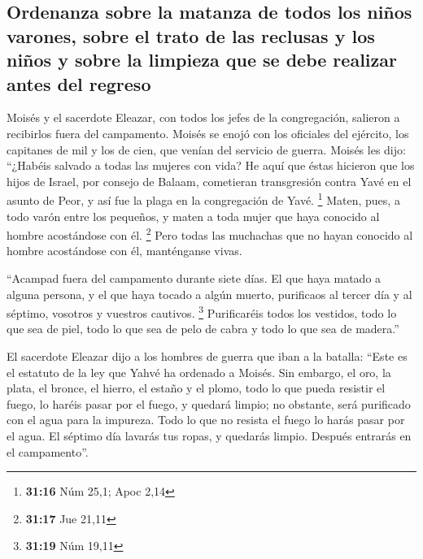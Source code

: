 \hypertarget{ordenanza-sobre-la-matanza-de-todos-los-niuxf1os-varones-sobre-el-trato-de-las-reclusas-y-los-niuxf1os-y-sobre-la-limpieza-que-se-debe-realizar-antes-del-regreso}{%
\subsection{Ordenanza sobre la matanza de todos los niños varones, sobre
el trato de las reclusas y los niños y sobre la limpieza que se debe
realizar antes del
regreso}\label{ordenanza-sobre-la-matanza-de-todos-los-niuxf1os-varones-sobre-el-trato-de-las-reclusas-y-los-niuxf1os-y-sobre-la-limpieza-que-se-debe-realizar-antes-del-regreso}}

 Moisés y el sacerdote Eleazar, con todos los jefes de la
congregación, salieron a recibirlos fuera del campamento.
 Moisés se enojó con los oficiales del ejército, los
capitanes de mil y los de cien, que venían del servicio de guerra.
 Moisés les dijo: ``¿Habéis salvado a todas las mujeres
con vida?  He aquí que éstas hicieron que los hijos de
Israel, por consejo de Balaam, cometieran transgresión contra Yavé en el
asunto de Peor, y así fue la plaga en la congregación de Yavé.
\footnote{\textbf{31:16} Núm 25,1; Apoc 2,14}  Maten,
pues, a todo varón entre los pequeños, y maten a toda mujer que haya
conocido al hombre acostándose con él. \footnote{\textbf{31:17} Jue
  21,11}  Pero todas las muchachas que no hayan conocido
al hombre acostándose con él, manténganse vivas.

 ``Acampad fuera del campamento durante siete días. El
que haya matado a alguna persona, y el que haya tocado a algún muerto,
purificaos al tercer día y al séptimo, vosotros y vuestros cautivos.
\footnote{\textbf{31:19} Núm 19,11}  Purificaréis todos
los vestidos, todo lo que sea de piel, todo lo que sea de pelo de cabra
y todo lo que sea de madera.''

 El sacerdote Eleazar dijo a los hombres de guerra que
iban a la batalla: ``Este es el estatuto de la ley que Yahvé ha ordenado
a Moisés.  Sin embargo, el oro, la plata, el bronce, el
hierro, el estaño y el plomo,  todo lo que pueda resistir
el fuego, lo haréis pasar por el fuego, y quedará limpio; no obstante,
será purificado con el agua para la impureza. Todo lo que no resista el
fuego lo harás pasar por el agua.  El séptimo día lavarás
tus ropas, y quedarás limpio. Después entrarás en el campamento''.

